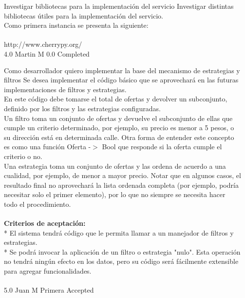 		{Investigar bibliotecas para la implementación del servicio} %
		{Investigar distintas bibliotecas útiles para la implementación del servicio.\\
Como primera instancia se presenta la siguiente:\\
  \\
http://www.cherrypy.org/\\
} %
		{4.0} %
		{Martin M} %
		{0.0} %
		{Completed} %


\vspace{20pt}

	{Como desarrollador quiero implementar la base del mecanismo de estrategias y filtros} %
	{Se desea implementar el código básico que se aprovechará en las futuras\\
implementaciones de filtros y estrategias.\\
En este código debe tomarse el total de ofertas y devolver un subconjunto,\\
definido por los filtros y  las estrategias configuradas.\\
Un filtro toma un conjunto de ofertas y devuelve el subconjunto de ellas que\\
cumple un criterio determinado, por ejemplo, su precio es menor a 5 pesos, o\\
su dirección está en determinada calle. Otra forma de entender este concepto\\
es como una función Oferta -$>$  Bool que responde si la oferta cumple el\\
criterio o no.\\
Una estrategia toma un conjunto de ofertas y las ordena de acuerdo a una\\
cualidad, por ejemplo, de menor a mayor precio. Notar que en algunos casos, el\\
resultado final no aprovechará la lista ordenada completa (por ejemplo, podría\\
necesitar solo el primer elemento), por lo que no siempre se necesita hacer\\
todo el procedimiento.\\
  \\
\textbf{Criterios de aceptación:}\\
* El sistema tendrá código que le permita llamar a un manejador de filtros y estrategias.  \\
* Se podrá invocar la aplicación de un filtro o estrategia "nulo". Esta operación no tendrá ningún efecto en los datos, pero su código será fácilmente extensible para agregar funcionalidades.  \\
  \\
} %
	{} %
	{5.0} %
	{Juan M} %
	{Primera} %
	{Accepted} %

